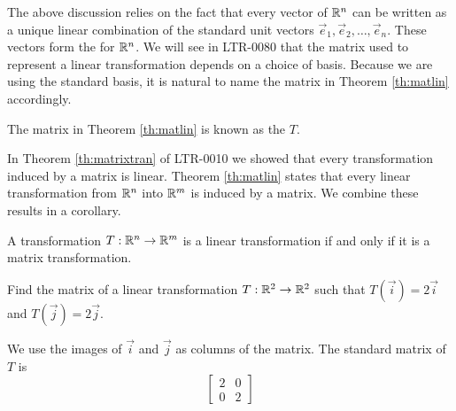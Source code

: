 \documentclass{ximera}
\begin{document}
The above discussion relies on the fact that every vector of $\mathbb{R}^n$ can be written as a unique linear combination of the standard unit vectors $\vec{e}_1,\vec{e}_2,\dots,\vec{e}_n$.  These vectors form the  for $\mathbb{R}^n$.  We will see in LTR-0080 that the matrix used to represent a linear transformation depends on a choice of basis.  Because we are using the standard basis, it is natural to name the matrix in Theorem \ref{th:matlin} accordingly.


\begin{definition} \label{def:standardmatoflintrans}
  
The matrix in Theorem \ref{th:matlin} is known as the  $T$.
  
\end{definition}


In Theorem \ref{th:matrixtran} of LTR-0010 we showed that every transformation induced by a matrix is linear.  Theorem \ref{th:matlin} states that every linear transformation from $\mathbb{R}^n$ into $\mathbb{R}^m$ is induced by a matrix.  We combine these results in a corollary.


  \begin{corollary}\label{cor:lintransmattrans} A transformation $T:\mathbb{R}^n\rightarrow\mathbb{R}^m$ is a linear transformation if and only if it is a matrix transformation.
\end{corollary}

\begin{example}\label{ex:findmatrix}
Find the matrix of a linear transformation $T:\mathbb{R}^2\rightarrow \mathbb{R}^2$ such that $T(\vec{i})=2\vec{i}$ and $T(\vec{j})=2\vec{j}$.  
\begin{explanation}
We use the images of $\vec{i}$ and $\vec{j}$ as columns of the matrix.  The standard matrix of $T$ is
$$\begin{bmatrix}2&0\\0&2\end{bmatrix}$$
\end{explanation}
\end{example}
 
 
 
\end{document}
